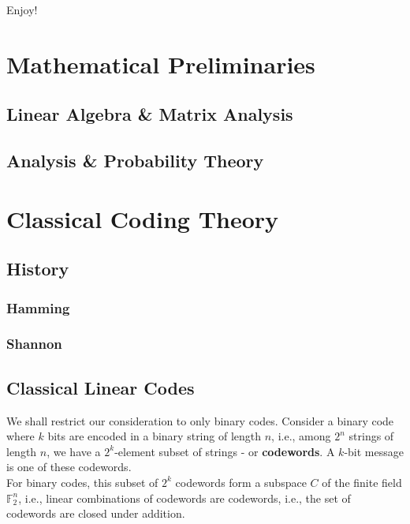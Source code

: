 \documentclass{article}
\theoremstyle{definition}
\begin{document}
Enjoy!


\newpage
\tableofcontents
\newpage

\section{Mathematical Preliminaries}
\newpage
\subsection{Linear Algebra \& Matrix Analysis}
\newpage
\subsection{Analysis \& Probability Theory}
\newpage

\section{Classical Coding Theory}




\subsection{History}


\subsubsection{Hamming}

\subsubsection{Shannon}



\subsection{Classical Linear Codes}

We shall restrict our consideration to only binary codes. Consider a binary code where $k$ bits are encoded in a binary string of length $n$, i.e., among $2^n$ strings of length $n$, we have a $2^k$-element subset of strings - or \textbf{codewords}. A $k$-bit message is one of these codewords. \\

For binary codes, this subset of $2^k$ codewords form a subspace $C$ of the finite field $\mathbb{F}^n_2$, i.e., linear combinations of codewords are codewords, i.e., the set of codewords are closed under addition. \\
\end{document}
